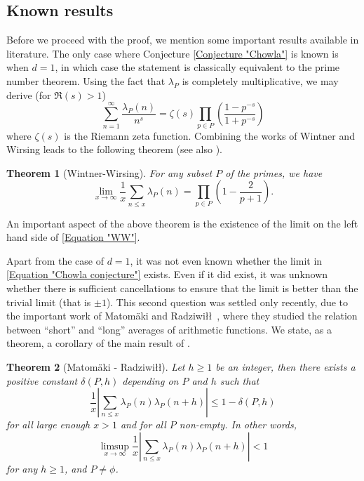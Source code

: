 \documentclass[12pt, a4paper]{amsart}
\newtheorem{theorem}{Theorem}
\theoremstyle{remark}
\theoremstyle{proof}
\numberwithin{equation}{section}
\numberwithin{assumption}{section}
\begin{document}
	\subsection{Known results}
	
	Before we proceed with the proof, we mention some important results available in literature. The only case where Conjecture \ref{Conjecture "Chowla"} is known is when $d=1$, in which case the statement is classically equivalent to the prime number theorem. Using the fact that $\lambda_P$ is completely multiplicative, we may derive (for $\Re(s) > 1$)
	\[
	\sum_{n=1}^{\infty} \frac{\lambda_P(n)}{n^s} = \zeta(s) \prod_{p\in P} \left(\frac{1-p^{-s}}{1+p^{-s}}\right)
	\]
	where $\zeta(s)$ is the Riemann zeta function. Combining the works of Wintner \cite{Wintner1} and Wirsing \cite{Wrising} leads to the following theorem (see also \cite[Theorem 2]{BorweinTransactions}).
	\begin{theorem}[Wintner-Wirsing]\label{Theorem "Wintner-Wirsing"}
		For any subset $P$ of the primes, we have
		\begin{equation}\label{Equation "WW"}
			\lim_{x\to\infty} \frac{1}{x} \sum_{n\leqslant x} \lambda_P(n) = \prod_{p\in P} \left(1-\frac{2}{p+1}\right).
		\end{equation}
	\end{theorem}
	An important aspect of the above theorem is the existence of the limit on the left hand side of \eqref{Equation "WW"}.
	
	Apart from the case of $d=1$, it was not even known whether the limit in \eqref{Equation "Chowla conjecture"} exists. Even if it did exist, it was unknown whether there is sufficient cancellations to ensure that the limit is better than the trivial limit (that is $\pm 1$). This second question was settled only recently, due to the important work of Matom\"aki and Radziwi\l\l\ \cite{MatoRadz}, where they studied the relation between ``short'' and ``long'' averages of arithmetic functions. We state, as a theorem, a corollary of the main result of \cite{MatoRadz}.
	
	\begin{theorem}[Matom\"aki - Radziwi\l\l]\label{Theorem "MatoRadz"}
		Let $h\geqslant 1$ be an integer, then there exists a positive constant $\delta(P,h)$ depending on $P$ and $h$ such that
		\[
		\frac{1}{x} \left|\sum_{n\leqslant x} \lambda_P(n)\lambda_P(n+h)\right| \leqslant 1-\delta(P,h)
		\]
		for all large enough $x > 1$ and for all $P$ non-empty. In other words, 
		\begin{equation}\label{Equation "MatoRadz"}
			\limsup_{x\to\infty} \frac{1}{x} \left|\sum_{n\leqslant x} \lambda_P(n)\lambda_P(n+h)\right| < 1
		\end{equation}
		for any $h\geqslant 1$, and $P\neq \phi$.
	\end{theorem}
	
\end{document}
